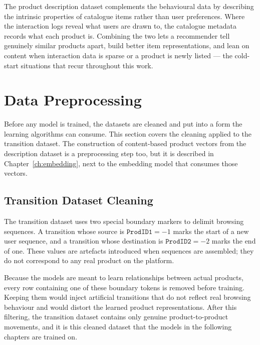The product description dataset complements the behavioural data by describing
the intrinsic properties of catalogue items rather than user preferences. Where
the interaction logs reveal what users are drawn to, the catalogue metadata
records what each product is. Combining the two lets a recommender tell
genuinely similar products apart, build better item representations, and lean on
content when interaction data is sparse or a product is newly listed --- the
cold-start situations that recur throughout this work.

\section{Data Preprocessing}
\label{sec:data-preprocessing}

Before any model is trained, the datasets are cleaned and put into a form the
learning algorithms can consume. This section covers the cleaning applied to the
transition dataset. The construction of content-based product vectors from the
description dataset is a preprocessing step too, but it is described in
Chapter~\ref{ch:embedding}, next to the embedding model that consumes those
vectors.

\subsection{Transition Dataset Cleaning}
\label{sec:transition-cleaning}
The transition dataset uses two special boundary markers to delimit browsing
sequences. A transition whose source is $\texttt{ProdID1} = -1$ marks the start
of a new user sequence, and a transition whose destination is
$\texttt{ProdID2} = -2$ marks the end of one. These values are artefacts
introduced when sequences are assembled; they do not correspond to any real
product on the platform.

Because the models are meant to learn relationships between actual products,
every row containing one of these boundary tokens is removed before training.
Keeping them would inject artificial transitions that do not reflect real
browsing behaviour and would distort the learned product representations. After
this filtering, the transition dataset contains only genuine
product-to-product movements, and it is this cleaned dataset that the models in
the following chapters are trained on.
